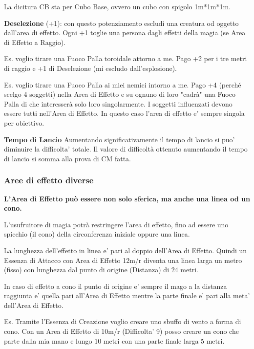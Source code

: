 \documentclass[a4paper,11pt,twoside,openany]{book}
\begin{document}
La dicitura CB sta per Cubo Base, ovvero un cubo con spigolo 1m*1m*1m.

\textbf{Deselezione} (+1): con questo potenziamento escludi una creatura od oggetto dall'area di  effetto. Ogni +1 toglie una persona dagli effetti della magia (se Area di Effetto a Raggio).

Es. voglio tirare una Fuoco Palla toroidale attorno a me. Pago +2 per i tre metri di raggio e +1 di Deselezione (mi escludo dall'esplosione).

Es. voglio tirare una Fuoco Palla ai miei nemici intorno a me. Pago +4 (perché scelgo 4 soggetti) nella Area di Effetto e su ognuno di loro "cadrà" una Fuoco Palla di che interesserà solo loro singolarmente. I soggetti influenzati devono essere tutti nell'Area di Effetto. In questo caso l'area di effetto e' sempre singola per obiettivo.


\textbf{Tempo di Lancio}  
Aumentando significativamente il tempo di lancio  si puo' diminuire la difficolta' totale.
Il valore di difficoltà ottenuto aumentando il tempo di lancio si somma alla prova di CM fatta.

\subsubsection{Aree di effetto diverse}

\label{aree-di-effetto-diverse}

\textbf{L'Area di Effetto può essere non solo sferica, ma anche una linea od un cono.}

L'usufruitore di magia potrà restringere l'area di effetto, fino ad essere uno spicchio (il cono) della circonferenza iniziale oppure una linea.

La lunghezza dell'effetto in linea e' pari al doppio dell'Area di Effetto. Quindi un Essenza di Attacco con Area di Effetto 12m/r diventa una linea larga un metro (fisso) con lunghezza dal punto di origine (Distanza) di 24 metri.

In caso di effetto a cono il punto di origine e' sempre il mago a la distanza raggiunta e' quella pari all'Area di Effetto mentre la parte finale e' pari alla meta' dell'Area di Effetto.

Es. Tramite l'Essenza di Creazione voglio creare uno sbuffo di vento a forma di cono.
Con un Area di Effetto di 10m/r (Difficolta' 9) posso creare un cono che parte dalla mia mano e lungo 10 metri con una parte finale larga 5 metri.
\end{document}
